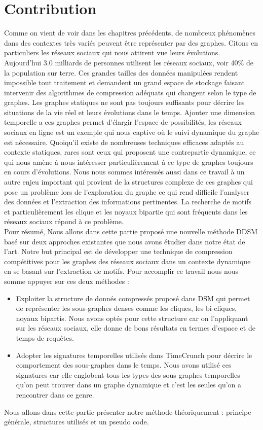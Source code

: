\documentclass[a4paper,oneside,12pt]{report}
\theoremstyle{definition}
\begin{document}
	\chapter{Contribution}
		Comme on vient de voir dans les chapitres précédents, de nombreux phénomènes dans des contextes très variés peuvent être représenter par des graphes. Citons en particuliers les réseaux sociaux qui nous attirent vue leurs évolutions. Aujourd'hui 3.0 milliards de personnes utilisent les réseaux sociaux, voir 40\% de la population sur terre. Ces grandes tailles des données manipulées rendent impossible tout traitement et demandent un grand espace de stockage faisant intervenir des algorithmes de compression adéquats qui changent selon le type de graphes. Les graphes statiques ne sont pas toujours suffisants pour décrire les situations de la vie réel et leurs évolutions dans le temps. Ajouter une dimension temporelle a ces graphes permet d'élargir l'espace de possibilités, les réseaux sociaux en ligne est un exemple qui nous captive où le suivi dynamique du graphe est nécessaire. Quoiqu'il existe de nombreuses techniques efficaces adaptés au contexte statiques, rares sont ceux qui proposent une contrepartie dynamique, ce qui nous amène à nous intéresser particulièrement à ce type de graphes toujours en cours d'évolutions. Nous nous sommes intéressés aussi dans ce travail à un autre enjeu important qui provient de la structures complexe de ces graphes qui pose un problème lors de l'exploration du graphe ce qui rend difficile l'analyser des données et l'extraction des informations pertinentes. La recherche de motifs et particulièrement les clique et les noyaux bipartie qui sont fréquents dans les réseaux sociaux répond à ce problème.\\
Pour résumé, Nous allons dans cette partie proposé une nouvelle méthode DDSM basé sur deux approches existantes que nous avons étudier dans notre état de l'art. Notre but principal est de développer une technique de compression compétitives pour les graphes des réseaux sociaux dans un contexte dynamique en se basant sur l'extraction de motifs. Pour accomplir ce travail nous nous somme appuyer sur ces deux méthodes :
\begin{itemize}
\item Exploiter la structure de donnés compressés proposé dans DSM \citep{hernandez2014compressed} qui permet de représenter les sous-graphes denses comme les cliques, les bi-cliques, noyaux bipartis. Nous avons optés pour cette structure car on l'appliquant sur les réseaux sociaux, elle donne de bons résultats en termes d'espace et de temps de requêtes.  
\item Adopter les signatures temporelles utilisés dans TimeCrunch \citep{shah2015timecrunch} pour décrire le comportement des sous-graphes dans le temps. Nous avons utilisé ces signatures car elle englobent tous les types des sous graphes temporelles qu'on peut trouver dans un graphe dynamique et c'est les seules qu'on a rencontrer dans ce genre.
\end{itemize}	
Nous allons dans cette partie présenter notre méthode théoriquement : principe générale, structures utilisés et un pseudo code.	
		
\end{document}
